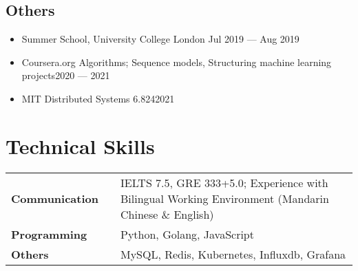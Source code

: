 \documentclass[a4,10pt]{article}
\newcommand{\subtext}[1]{
#1\par\vspace{-0.2cm}}
\newenvironment{zitemize}{
\begin{itemize}\itemsep0pt \parskip0pt \parsep1pt}
{\end{itemize}\vspace{-0.5cm}}
\newcommand{\hskills}[1]{
\textbf{\bfseries #1} }
\begin{document}
\subsection*{Others}
\begin{zitemize}
    \item
        \subtext{Summer School, University College London \hfill Jul 2019 --- Aug 2019}
        \vspace{0.1cm}
    \item
        \subtext{Coursera.org Algorithms; Sequence models, Structuring machine learning projects\hfill 2020 --- 2021 }
        \vspace{0.1cm}
    \item
        \subtext{MIT Distributed Systems 6.824\hfill2021}
        \vspace{0.1cm}
\end{zitemize}
\vspace{0.2cm}



\section{Technical Skills}
\begin{tabular}{p{11em} p{1em} p{43em}}
\hskills{Communication} & & IELTS 7.5, GRE 333+5.0; Experience with Bilingual Working Environment (Mandarin Chinese \& English)  \\
\hskills{Programming} &  & Python, Golang, JavaScript \\
\hskills{Others} & & MySQL, Redis, Kubernetes, Influxdb, Grafana
\end{tabular}
\vspace{-0.2cm}




\end{document}
